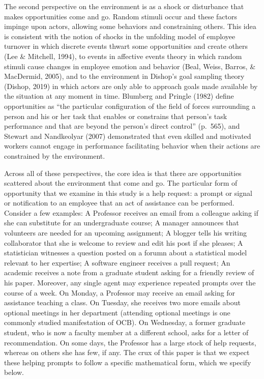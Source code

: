\documentclass[english,,man]{apa6}
\theoremstyle{definition}
\theoremstyle{definition}
\theoremstyle{definition}
\theoremstyle{remark}
\begin{document}
The second perspective on the environment is as a shock or disturbance
that makes opportunities come and go. Random stimuli occur and these
factors impinge upon actors, allowing some behaviors and constraining
others. This idea is consistent with the notion of shocks in the
unfolding model of employee turnover in which discrete events thwart
some opportunities and create others (Lee \& Mitchell, 1994), to events
in affective events theory in which random stimuli cause changes in
employee emotion and behavior (Beal, Weiss, Barros, \& MacDermid, 2005),
and to the environment in Dishop's goal sampling theory (Dishop, 2019)
in which actors are only able to approach goals made available by the
situation at any moment in time. Blumberg and Pringle (1982) define
opportunities as \enquote{the particular configuration of the field of
forces surrounding a person and his or her task that enables or
constrains that person's task performance and that are beyond the
person's direct control} (p.~565), and Stewart and Nandkeolyar (2007)
demonstrated that even skilled and motivated workers cannot engage in
performance facilitating behavior when their actions are constrained by
the environment.

Across all of these perspectives, the core idea is that there are
opportunities scattered about the environment that come and go. The
particular form of opportunity that we examine in this study is a help
request: a prompt or signal or notification to an employee that an act
of assistance can be performed. Consider a few examples: A Professor
receives an email from a colleague asking if she can substitute for an
undergraduate course; A manager announces that volunteers are needed for
an upcoming assignment; A blogger tells his writing collaborator that
she is welcome to review and edit his post if she pleases; A
statistician witnesses a question posted on a forumn about a statistical
model relevant to her expertise; A software engineer receives a pull
request; An academic receives a note from a graduate student asking for
a friendly review of his paper. Moreover, any single agent may
experience repeated prompts over the course of a week. On Monday, a
Professor may receive an email asking for assistance teaching a class.
On Tuesday, she receives two more emails about optional meetings in her
department (attending optional meetings is one commonly studied
manifestation of OCB). On Wednesday, a former graduate student, who is
now a faculty member at a different school, asks for a letter of
recommendation. On some days, the Professor has a large stock of help
requests, whereas on others she has few, if any. The crux of this paper
is that we expect these helping prompts to follow a specific
mathematical form, which we specify below.
\end{document}
